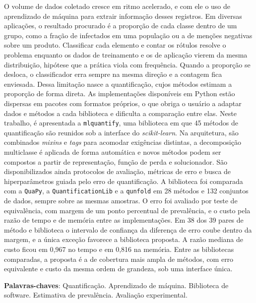 \begin{resumo}

O volume de dados coletado cresce em ritmo acelerado, e com ele o uso de aprendizado de
máquina para extrair informação desses registros. Em diversas aplicações, o resultado
procurado é a proporção de cada classe dentro de um grupo, como a fração de infectados
em uma população ou a de menções negativas sobre um produto. Classificar cada elemento e
contar os rótulos resolve o problema enquanto os dados de treinamento e os de aplicação
vierem da mesma distribuição, hipótese que a prática viola com frequência. Quando a
proporção se desloca, o classificador erra sempre na mesma direção e a contagem fica
enviesada. Dessa limitação nasce a quantificação, cujos métodos estimam a proporção de
forma direta. As implementações disponíveis em Python estão dispersas em pacotes com
formatos próprios, o que obriga o usuário a adaptar dados e métodos a cada biblioteca e
dificulta a comparação entre elas. Neste trabalho, é apresentada a \texttt{mlquantify},
uma biblioteca em que 45 métodos de quantificação são reunidos sob a interface do
\textit{scikit-learn}. Na arquitetura, são combinados \textit{mixins} e \textit{tags}
para acomodar exigências distintas, a decomposição multiclasse é aplicada de forma
automática e novos métodos podem ser compostos a partir de representação, função de
perda e solucionador. São disponibilizados ainda protocolos de avaliação, métricas de
erro e busca de hiperparâmetros guiada pelo erro de quantificação. A biblioteca foi
comparada com a \texttt{QuaPy}, a \texttt{QuantificationLib} e a \texttt{qunfold} em 28
métodos e 132 conjuntos de dados, sempre sobre as mesmas amostras. O erro foi avaliado
por teste de equivalência, com margem de um ponto percentual de prevalência, e o custo
pela razão de tempo e de memória entre as implementações. Em 38 dos 39 pares de método e
biblioteca o intervalo de confiança da diferença de erro coube dentro da margem, e a
única exceção favorece a biblioteca proposta. A razão mediana de custo ficou em 0,967 no
tempo e em 0,816 na memória. Entre as bibliotecas comparadas, a proposta é a de
cobertura mais ampla de métodos, com erro equivalente e custo da mesma ordem de
grandeza, sob uma interface única.

\vspace{\onelineskip}
\noindent
\textbf{Palavras-chaves}: Quantificação. Aprendizado de máquina. Biblioteca de software. Estimativa de prevalência. Avaliação experimental.
\end{resumo}
